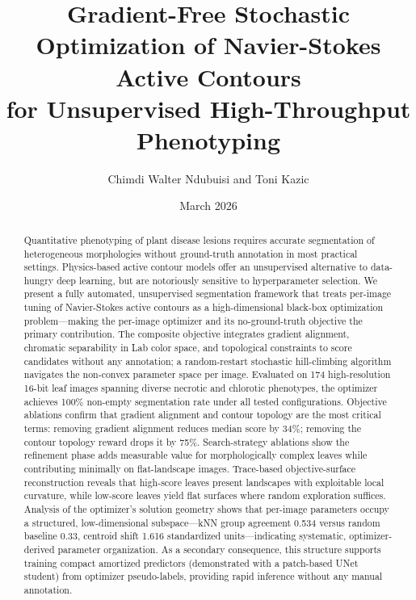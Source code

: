 \documentclass[11pt,a4paper]{article}
\begin{document}
\title{Gradient-Free Stochastic Optimization of Navier-Stokes Active Contours\\for Unsupervised High-Throughput Phenotyping}

\author{Chimdi Walter Ndubuisi and Toni Kazic}
\date{March 2026}

\maketitle

\begin{abstract}
Quantitative phenotyping of plant disease lesions requires accurate segmentation of heterogeneous morphologies without ground-truth annotation in most practical settings. Physics-based active contour models offer an unsupervised alternative to data-hungry deep learning, but are notoriously sensitive to hyperparameter selection. We present a fully automated, unsupervised segmentation framework that treats per-image tuning of Navier-Stokes active contours as a high-dimensional black-box optimization problem---making the per-image optimizer and its no-ground-truth objective the primary contribution. The composite objective integrates gradient alignment, chromatic separability in Lab color space, and topological constraints to score candidates without any annotation; a random-restart stochastic hill-climbing algorithm navigates the non-convex parameter space per image. Evaluated on 174 high-resolution 16-bit leaf images spanning diverse necrotic and chlorotic phenotypes, the optimizer achieves 100\% non-empty segmentation rate under all tested configurations. Objective ablations confirm that gradient alignment and contour topology are the most critical terms: removing gradient alignment reduces median score by 34\%; removing the contour topology reward drops it by 75\%. Search-strategy ablations show the refinement phase adds measurable value for morphologically complex leaves while contributing minimally on flat-landscape images. Trace-based objective-surface reconstruction reveals that high-score leaves present landscapes with exploitable local curvature, while low-score leaves yield flat surfaces where random exploration suffices. Analysis of the optimizer's solution geometry shows that per-image parameters occupy a structured, low-dimensional subspace---kNN group agreement 0.534 versus random baseline 0.33, centroid shift 1.616 standardized units---indicating systematic, optimizer-derived parameter organization. As a secondary consequence, this structure supports training compact amortized predictors (demonstrated with a patch-based UNet student) from optimizer pseudo-labels, providing rapid inference without any manual annotation.
\end{abstract}
\end{document}
